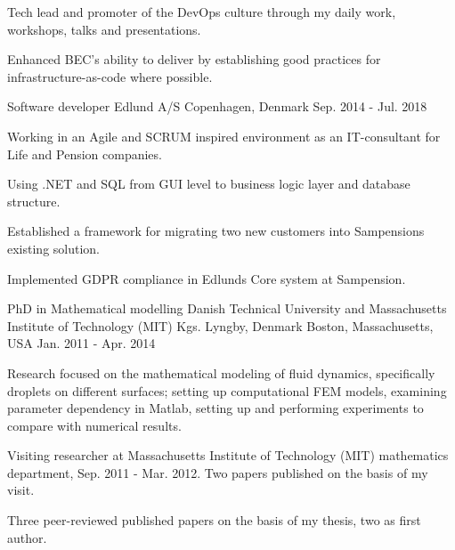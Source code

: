 \begin{cventries}
{\begin{cvitems}
\item Tech lead and promoter of the DevOps culture through my daily work, workshops, talks and presentations.
\item Enhanced BEC's ability to deliver by establishing good practices for infrastructure-as-code where possible.
\end{cvitems}
}
\cventry
{Software developer} %
{Edlund A/S} %
{Copenhagen, Denmark} %
{Sep. 2014 - Jul. 2018 } %
{ %
\begin{cvitems}
\item {Working in an Agile and SCRUM inspired environment as an IT-consultant for Life and Pension companies.}
\item {Using .NET and SQL from GUI level to business logic layer and database structure.}
\item {Established a framework for migrating two new customers into Sampensions existing solution.}
\item {Implemented GDPR compliance in Edlunds Core system at Sampension.}
\end{cvitems}
}

\cventry
{PhD in Mathematical modelling} %
{Danish Technical University and Massachusetts Institute of Technology (MIT)} %
{Kgs. Lyngby, Denmark \newline Boston, Massachusetts, USA} %
{Jan. 2011 - Apr. 2014} %
{ %
\begin{cvitems}
\item {Research focused on the mathematical modeling of fluid dynamics, specifically droplets on different surfaces; setting up computational FEM models, examining parameter dependency in Matlab, setting up and performing experiments to compare with numerical results.}
\item Visiting researcher at Massachusetts Institute of Technology (MIT) mathematics department, Sep. 2011 - Mar. 2012. Two papers published on the basis of my visit.
\item Three peer-reviewed published papers on the basis of my thesis, two as first author.
\end{cvitems}
}
\end{cventries}
